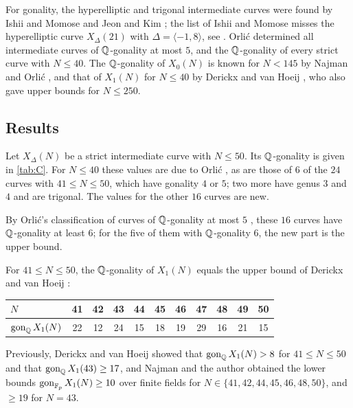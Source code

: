 For gonality, the hyperelliptic and trigonal intermediate curves were found by Ishii and Momose
\cite{IshiiMomose1991} and Jeon and Kim \cite{JeonKim2007}; the list of Ishii and Momose misses the hyperelliptic
curve $X_\Delta(21)$ with $\Delta=\langle-1,8\rangle$, see \cite{JeonKim2007,JeonKimSchweizer2020}. Orli\'c \cite{Orlic2025} determined all
intermediate curves of $\mathbb{Q}$-gonality at most $5$, and the $\mathbb{Q}$-gonality of every strict curve with $N\le40$.
The $\mathbb{Q}$-gonality of $X_0(N)$ is known for $N<145$ by Najman and Orli\'c \cite{NajmanOrlic2024}, and that
of $X_1(N)$ for $N\le40$ by Derickx and van Hoeij \cite{DerickxVanHoeij2014}, who also gave upper bounds
for $N\le 250$.

\subsection{Results}
\begin{theoremC}\label{thm:C}
Let $X_\Delta(N)$ be a strict intermediate curve with $N\le 50$. Its $\mathbb{Q}$-gonality is given in
\cref{tab:C}. For $N\le 40$ these values are due to Orli\'c \cite{Orlic2025}, as are those of $6$ of the
$24$ curves with $41\le N\le 50$, which have gonality $4$ or $5$; two more have genus $3$ and $4$ and are
trigonal. The values for the other $16$ curves are new.
\end{theoremC}

By Orli\'c's classification of curves of $\mathbb{Q}$-gonality at most $5$ \cite{Orlic2025}, these $16$ curves have
$\mathbb{Q}$-gonality at least $6$; for the five of them with $\mathbb{Q}$-gonality $6$, the new part is the upper bound.

\begin{theoremD}\label{thm:D}
For $41\le N\le 50$, the $\mathbb{Q}$-gonality of $X_1(N)$ equals the upper bound of Derickx and van Hoeij
\cite{DerickxVanHoeij2014}:
\begin{center}
\begin{tabular}{l|cccccccccc}
$N$ & 41 & 42 & 43 & 44 & 45 & 46 & 47 & 48 & 49 & 50\\\hline
$\operatorname{gon}_{\mathbb{Q}} X_1(N)$ & 22 & 12 & 24 & 15 & 18 & 19 & 29 & 16 & 21 & 15
\end{tabular}
\end{center}
\end{theoremD}

Previously, Derickx and van Hoeij \cite[\S5]{DerickxVanHoeij2014} showed that $\operatorname{gon}_{\mathbb{Q}} X_1(N)>8$ for
$41\le N\le50$ and that $\operatorname{gon}_{\mathbb{Q}} X_1(43)\ge17$, and Najman and the author \cite[Proposition~5.4 and Table~1]{NajmanVarivoda}
obtained the lower bounds $\operatorname{gon}_{\mathbb{F}_p}X_1(N)\ge10$ over finite fields for $N\in\{41,42,44,45,46,48,50\}$, and
$\ge19$ for $N=43$.


